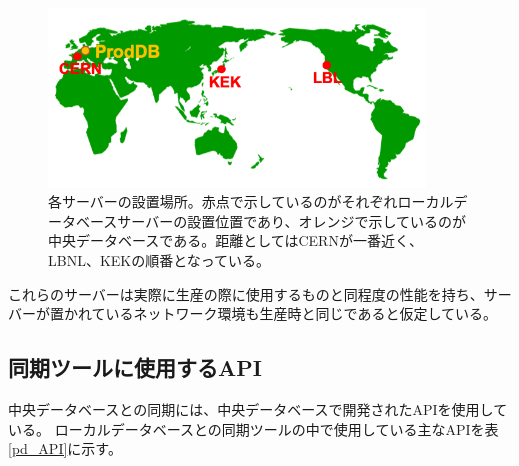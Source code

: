 \begin{figure}[bpt]\centering
\includegraphics[width=10cm]{./server_geometry.png}
\caption[各サーバーの設置場所]{各サーバーの設置場所。赤点で示しているのがそれぞれローカルデータベースサーバーの設置位置であり、オレンジで示しているのが中央データベースである。距離としてはCERNが一番近く、LBNL、KEKの順番となっている。}
\label{server_geometry}
\end{figure}

これらのサーバーは実際に生産の際に使用するものと同程度の性能を持ち、サーバーが置かれているネットワーク環境も生産時と同じであると仮定している。

\subsection{同期ツールに使用するAPI}
中央データベースとの同期には、中央データベースで開発されたAPIを使用している。
ローカルデータベースとの同期ツールの中で使用している主なAPIを表\ref{pd_API}に示す。

\begin{table}[tbp]
  \begin{center}
  \caption[同期ツールの中で使用する中央データベースの主なAPI一覧]{同期ツールの中で使用する中央データベースの主なAPI一覧。同期ツールにおいて、中央データベースの情報取得には提供されているいくつかのAPIを用いており代表的なものをいかに示す。このAPIをPythonを用いて実行することで、情報取得や試験結果のアップロードをすることができる。}
  \label{pd_API}
  \end{center}
\end{table}

